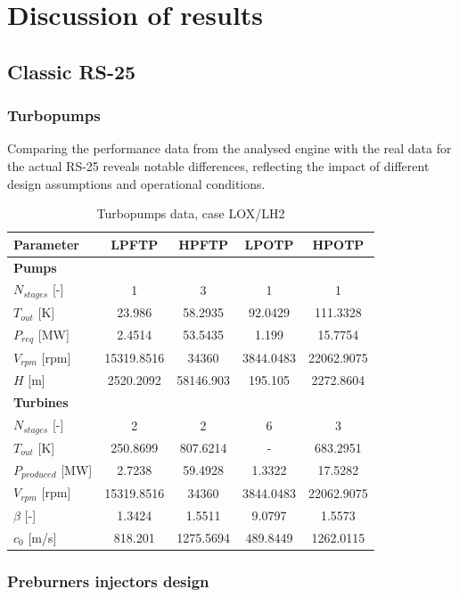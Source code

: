 \section{Discussion of results}
\subsection{Classic RS-25}
\subsubsection{Turbopumps}
Comparing the performance data from the analysed engine with the real data for the actual RS-25  reveals notable differences, reflecting the impact of different design assumptions and operational conditions.


\begin{table}[H]
\centering
\begin{tabular}{|l|c|c|c|c|}
\hline
\textbf{Parameter} & \textbf{LPFTP} & \textbf{HPFTP} & \textbf{LPOTP} & \textbf{HPOTP} \\ \hline
\textbf{Pumps} & & & & \\ \hline
$N_{stages}$ [-] & 1 & 3 & 1 & 1 \\ \hline
$T_{out}$  [K] & 23.986 & 58.2935 & 92.0429 & 111.3328\\ \hline
$P_{req}$ [MW] & 2.4514 & 53.5435 & 1.199 & 15.7754 \\ \hline
$V_{rpm}$ [rpm] & 15319.8516 & 34360 & 3844.0483 & 22062.9075 \\ \hline
$H$ [m] & 2520.2092 & 58146.903 & 195.105 & 2272.8604 \\ \hline
\textbf{Turbines} & & & & \\ \hline
$N_{stages}$ [-] & 2 & 2 & 6 & 3 \\ \hline
$T_{out}$  [K] & 250.8699 & 807.6214 & - & 683.2951 \\ \hline
$P_{produced}$ [MW] & 2.7238 & 59.4928 & 1.3322 & 17.5282 \\ \hline
$V_{rpm}$ [rpm] & 15319.8516 & 34360 & 3844.0483 & 22062.9075 \\ \hline
$\beta$ [-]& 1.3424 & 1.5511 & 9.0797 & 1.5573 \\ \hline
$c_{0}$  [m/s] & 818.201 & 1275.5694 & 489.8449 & 1262.0115 \\ \hline
\end{tabular}
\caption{Turbopumps data, case LOX/LH2}
\label{tab:turbo_pump_ox_fuel}
\end{table}

\subsubsection{Preburners injectors design}

